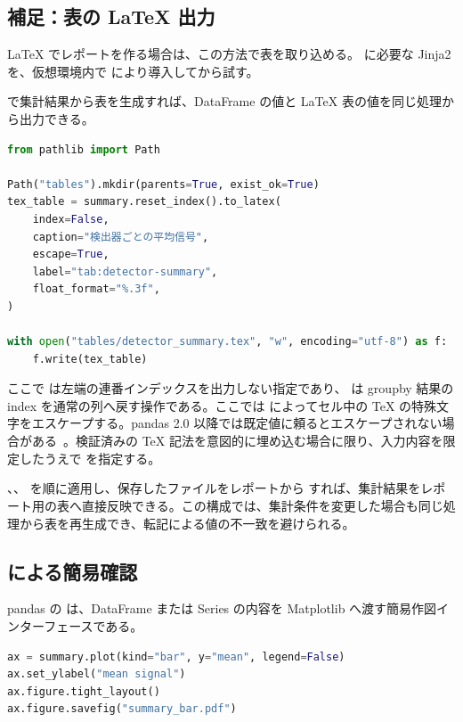 \subsection{補足：表の LaTeX 出力}

LaTeX でレポートを作る場合は、この方法で表を取り込める。 に必要な Jinja2 を、仮想環境内で  により導入してから試す。

 で集計結果から表を生成すれば、DataFrame の値と LaTeX 表の値を同じ処理から出力できる。

\begin{lstlisting}[language=Python]
from pathlib import Path

Path("tables").mkdir(parents=True, exist_ok=True)
tex_table = summary.reset_index().to_latex(
    index=False,
    caption="検出器ごとの平均信号",
    escape=True,
    label="tab:detector-summary",
    float_format="%.3f",
)

with open("tables/detector_summary.tex", "w", encoding="utf-8") as f:
    f.write(tex_table)
\end{lstlisting}

ここで  は左端の連番インデックスを出力しない指定であり、 は groupby 結果の index を通常の列へ戻す操作である。ここでは  によってセル中の TeX の特殊文字をエスケープする。pandas 2.0 以降では既定値に頼るとエスケープされない場合がある~\cite{pandas_latex}。検証済みの TeX 記法を意図的に埋め込む場合に限り、入力内容を限定したうえで  を指定する。

、、 を順に適用し、保存したファイルをレポートから \verb|| すれば、集計結果をレポート用の表へ直接反映できる。この構成では、集計条件を変更した場合も同じ処理から表を再生成でき、転記による値の不一致を避けられる。

\subsection{ による簡易確認}

pandas の  は、DataFrame または Series の内容を Matplotlib へ渡す簡易作図インターフェースである。

\begin{lstlisting}[language=Python]
ax = summary.plot(kind="bar", y="mean", legend=False)
ax.set_ylabel("mean signal")
ax.figure.tight_layout()
ax.figure.savefig("summary_bar.pdf")
\end{lstlisting}

